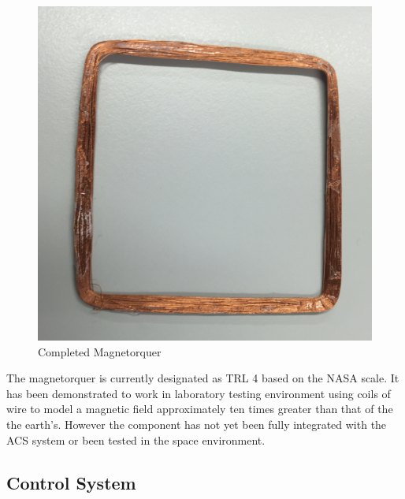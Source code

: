 \begin{center}
    \begin{figure}[H]
        \caption{Completed Magnetorquer}
        \vspace{-4mm}
        \centering
        \includegraphics[scale = 0.4]{./figures/Magnetorquer}
    \end{figure}
\end{center}
\vspace{-5mm}
The magnetorquer is currently designated as TRL 4 based on the NASA scale.  It has been demonstrated to work in laboratory testing environment using coils of wire to model a magnetic field approximately ten times greater than that of the the earth's. However the component has not yet been fully integrated with the ACS system or been tested in the space environment.  

\subsection{Control System}
